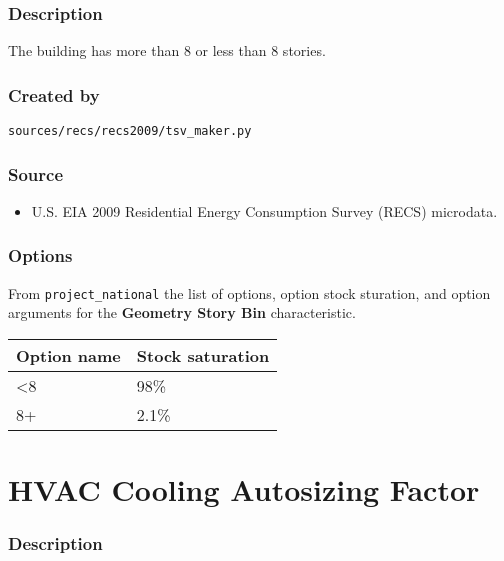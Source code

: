 \subsubsection{Description}\label{description-59}

The building has more than 8 or less than 8 stories.

\subsubsection{Created by}\label{created-by-59}

\texttt{sources/recs/recs2009/tsv\_maker.py}

\subsubsection{Source}\label{source-58}

\begin{itemize}
 
\item
  U.S. EIA 2009 Residential Energy Consumption Survey (RECS) microdata.
\end{itemize}

\subsubsection{Options}\label{options-59}

From \texttt{project\_national} the list of options, option stock
sturation, and option arguments for the \textbf{Geometry Story Bin}
characteristic.

\begin{longtable}[]{@{}ll@{}}
\toprule\noalign{}
Option name & Stock saturation \\
\midrule\noalign{}
\endhead
\bottomrule\noalign{}
\endlastfoot
\textless8 & 98\% \\
8+ & 2.1\% \\
\end{longtable}




\section{HVAC Cooling Autosizing
Factor}\label{hvac_cooling_autosizing_factor}

\subsubsection{Description}\label{description-63}


